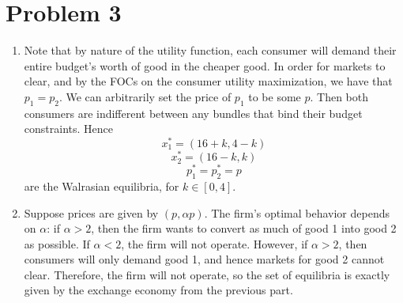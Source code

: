 \documentclass[10pt,letter]{article}
\begin{document}
\section*{Problem 3}
\begin{enumerate}[label=(\alph*)]
  \item Note that by nature of the utility function, each consumer will demand their entire budget's worth of good in the cheaper good. In order for markets to clear, and by the FOCs on the consumer utility maximization, we have that $p_1 = p_2$. We can arbitrarily set the price of $p_1$ to be some $p$. Then both consumers are indifferent between any bundles that bind their budget constraints. Hence
  \[ x^*_1 = (16+k, 4-k)   \]
  \[ x^*_2 = (16-k, k)   \]
  \[ p^*_1 = p^*_2 = p \]
  are the Walrasian equilibria, for $k \in [0, 4]$.
  \item Suppose prices are given by $(p, \alpha p)$. The firm's optimal behavior depends on $\alpha$: if $\alpha > 2$, then the firm wants to convert as much of good 1 into good 2 as possible. If $\alpha < 2$, the firm will not operate. However, if $\alpha > 2$, then consumers will only demand good 1, and hence markets for good 2 cannot clear. Therefore, the firm will not operate, so the set of equilibria is exactly given by the exchange economy from the previous part.
\end{enumerate}
\end{document}
